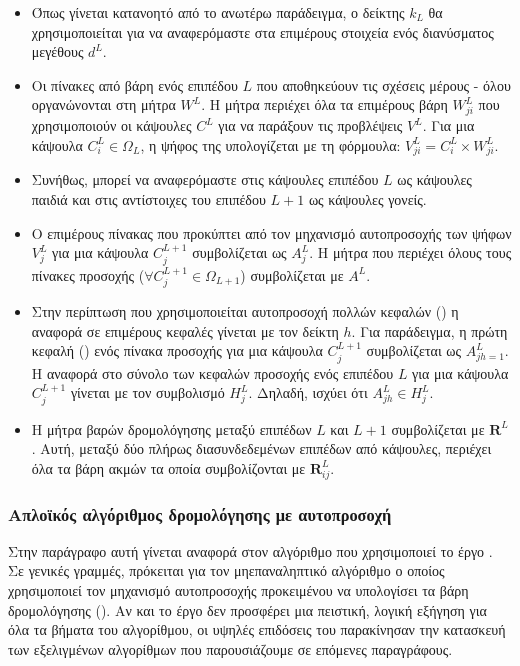 \begin{itemize}
  \item Όπως γίνεται κατανοητό από το ανωτέρω παράδειγμα, ο δείκτης $k_L$ θα χρησιμοποιείται για να αναφερόμαστε στα επιμέρους στοιχεία ενός διανύσματος μεγέθους $d^L$.
  \item Οι πίνακες από βάρη ενός επιπέδου $L$ που αποθηκεύουν τις σχέσεις μέρους - όλου οργανώνονται στη μήτρα $W^L$. Η μήτρα περιέχει όλα τα επιμέρους βάρη $W_{ji}^L$ που χρησιμοποιούν οι κάψουλες $C^L$ για να παράξουν τις προβλέψεις $V^L$. Για μια κάψουλα $C_i^L \in \Omega_L$, η ψήφος της υπολογίζεται με τη φόρμουλα: $V_{ji}^L = C_i^L \times W_{ji}^L$.
  \item Συνήθως, μπορεί να αναφερόμαστε στις κάψουλες επιπέδου $L$ ως κάψουλες παιδιά και στις αντίστοιχες του επιπέδου $L+1$ ως κάψουλες γονείς.
  \item Ο επιμέρους πίνακας που προκύπτει από τον μηχανισμό αυτο\textendash προσοχής των ψήφων $V^L_j$ για μια κάψουλα $C_j^{L+1}$ συμβολίζεται ως $Α^L_j$. Η μήτρα που περιέχει όλους τους πίνακες προσοχής ($\forall C_j^{L+1} \in \Omega_{L+1}$) συμβολίζεται με $A^L$.
  \item Στην περίπτωση που χρησιμοποιείται αυτο\textendash προσοχή πολλών κεφαλών () η αναφορά σε επιμέρους κεφαλές γίνεται με τον δείκτη $h$. Για παράδειγμα, η πρώτη κεφαλή () ενός πίνακα προσοχής για μια κάψουλα $C^{L+1}_j$ συμβολίζεται ως $A_{jh=1}^L$. Η αναφορά στο σύνολο των κεφαλών προσοχής ενός επιπέδου $L$ για μια κάψουλα $C_j^{L+1}$ γίνεται με τον συμβολισμό $H_j^L$. Δηλαδή, ισχύει ότι $A_{jh}^L \in H_j^L$.
  \item Η μήτρα βαρών δρομολόγησης μεταξύ επιπέδων $L$ και $L + 1$ συμβολίζεται με $\mathbf{R}^L$. Αυτή, μεταξύ δύο πλήρως διασυνδεδεμένων επιπέδων από κάψουλες, περιέχει όλα τα βάρη ακμών τα οποία συμβολίζονται με $\mathbf{R}_{ij}^L$.
\end{itemize}


\subsubsection{Απλοϊκός αλγόριθμος δρομολόγησης με αυτο\textendash προσοχή}

Στην παράγραφο αυτή γίνεται αναφορά στον αλγόριθμο που χρησιμοποιεί το έργο \cite{mazzia2021efficient}. Σε γενικές γραμμές, πρόκειται για τον μη\textendash επαναληπτικό αλγόριθμο ο οποίος χρησιμοποιεί τον μηχανισμό αυτο\textendash προσοχής προκειμένου να υπολογίσει τα βάρη δρομολόγησης (). Αν και το έργο δεν προσφέρει μια πειστική, λογική εξήγηση για όλα τα βήματα του αλγορίθμου, οι υψηλές επιδόσεις του παρακίνησαν την κατασκευή των εξελιγμένων αλγορίθμων που παρουσιάζουμε σε επόμενες παραγράφους.\par

